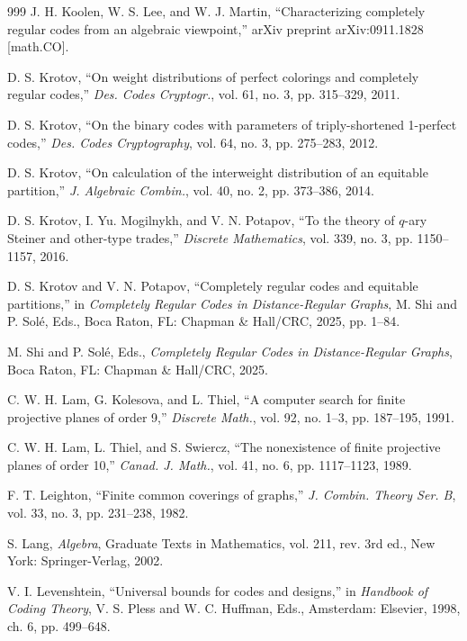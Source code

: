 \documentclass[11pt]{article}
\theoremstyle{definition}
\begin{document}
{{{\begin{thebibliography}{999}
J. H. Koolen, W. S. Lee, and W. J. Martin,
``Characterizing completely regular codes from an algebraic viewpoint,''
arXiv preprint arXiv:0911.1828 [math.CO].

D. S. Krotov,
``On weight distributions of perfect colorings and completely regular codes,''
\textit{Des. Codes Cryptogr.}, vol. 61, no. 3, pp. 315--329, 2011.

D. S. Krotov,
``On the binary codes with parameters of triply-shortened 1-perfect codes,''
\textit{Des. Codes Cryptography}, vol. 64, no. 3, pp. 275--283, 2012.

D. S. Krotov,
``On calculation of the interweight distribution of an equitable partition,''
\textit{J. Algebraic Combin.}, vol. 40, no. 2, pp. 373--386, 2014.

D. S. Krotov, I. Yu. Mogilnykh, and V. N. Potapov,
``To the theory of $q$-ary Steiner and other-type trades,''
\textit{Discrete Mathematics}, vol. 339, no. 3, pp. 1150--1157, 2016.

D. S. Krotov and V. N. Potapov,
``Completely regular codes and equitable partitions,''
in \textit{Completely Regular Codes in Distance-Regular Graphs},
M. Shi and P. Solé, Eds.,
Boca Raton, FL: Chapman \& Hall/CRC, 2025, pp. 1--84.



M. Shi and P. Solé, Eds.,
\textit{Completely Regular Codes in Distance-Regular Graphs},
Boca Raton, FL: Chapman \& Hall/CRC, 2025.

C. W. H. Lam, G. Kolesova, and L. Thiel,
``A computer search for finite projective planes of order 9,''
\textit{Discrete Math.}, vol. 92, no. 1--3, pp. 187--195, 1991.

C. W. H. Lam, L. Thiel, and S. Swiercz,
``The nonexistence of finite projective planes of order 10,''
\textit{Canad. J. Math.}, vol. 41, no. 6, pp. 1117--1123, 1989.

F. T. Leighton,
``Finite common coverings of graphs,''
\textit{J. Combin. Theory Ser. B}, vol. 33, no. 3, pp. 231--238, 1982.

S. Lang,
\textit{Algebra},
Graduate Texts in Mathematics, vol. 211, rev. 3rd ed.,
New York: Springer-Verlag, 2002.

V. I. Levenshtein,
``Universal bounds for codes and designs,''
in \textit{Handbook of Coding Theory},
V. S. Pless and W. C. Huffman, Eds.,
Amsterdam: Elsevier, 1998, ch. 6, pp. 499--648.


\end{thebibliography}}}}
\end{document}
